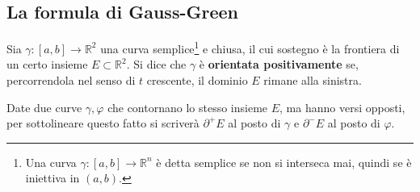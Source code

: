 \documentclass[11pt, a4paper]{scrartcl}
\theoremstyle{definition}
\numberwithin{esempio}{section}
\theoremstyle{definition}
\numberwithin{obs}{section}
\numberwithin{nota}{section}
\numberwithin{equation}{subsection}
\begin{document}
\subsection{La formula di Gauss-Green}
Sia $\gamma:\left[ a,b \right] \to \mathbb{R}^2$ una curva semplice\footnote{Una curva $\gamma:\left[ a,b \right] \to \mathbb{R}^n$ \`e detta semplice se non si interseca mai, quindi se \`e iniettiva in $(a,b)$.} e chiusa, il cui sostegno \`e la frontiera di un certo insieme $E \subset \mathbb{R}^2$.
Si dice che $\gamma$ \`e \textbf{orientata positivamente} se, percorrendola nel senso di $t$ crescente, il dominio $E$ rimane alla sinistra.

Date due curve $\gamma, \varphi $ che contornano lo stesso insieme $E$, ma hanno versi opposti, per sottolineare questo fatto si scriver\`a $\partial ^+E$ al posto di $\gamma$ e $\partial ^- E$ al posto di $\varphi $.
\end{document}
